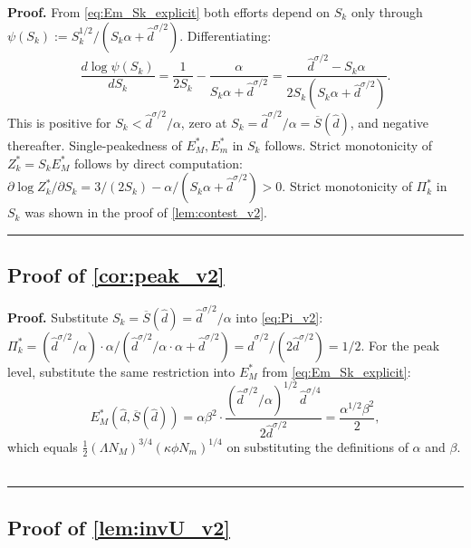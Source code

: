 \documentclass[11pt,twoside]{extarticle}
\newenvironment{proof}[1][Proof]{\noindent \textbf{#1.} }{\ \rule{0.5em}{0.5em}}
\begin{document}
\begin{proof}
From \autoref{eq:Em_Sk_explicit} both efforts depend on $S_k$ only through
$\psi(S_k) := S_k^{1/2} / (S_k\alpha + \hat d^{\sigma/2})$. Differentiating:
\[
\frac{d\log\psi(S_k)}{dS_k} = \frac{1}{2S_k} - \frac{\alpha}{S_k\alpha + \hat d^{\sigma/2}} = \frac{\hat d^{\sigma/2} - S_k\alpha}{2 S_k(S_k\alpha + \hat d^{\sigma/2})}.
\]
This is positive for $S_k < \hat d^{\sigma/2}/\alpha$, zero at
$S_k = \hat d^{\sigma/2}/\alpha = \overline S(\hat d)$, and negative thereafter.
Single-peakedness of $E_M^*, E_m^*$ in $S_k$ follows. Strict monotonicity
of $Z_k^* = S_k E_M^*$ follows by direct computation:
$\partial \log Z_k^* / \partial S_k = 3/(2S_k) - \alpha/(S_k\alpha + \hat d^{\sigma/2}) > 0$.
Strict monotonicity of $\Pi_k^*$ in $S_k$ was shown in the proof of
\autoref{lem:contest_v2}.
\end{proof}

\subsection*{Proof of \autoref{cor:peak_v2}} \label{app:proof:peak_v2}

\begin{proof}
Substitute $S_k = \overline S(\hat d) = \hat d^{\sigma/2} / \alpha$ into
\autoref{eq:Pi_v2}: $\Pi_k^* = (\hat d^{\sigma/2}/\alpha) \cdot \alpha / (\hat d^{\sigma/2}/\alpha \cdot \alpha + \hat d^{\sigma/2}) = \hat d^{\sigma/2} / (2\hat d^{\sigma/2}) = 1/2$.
For the peak level, substitute the same restriction into $E_M^*$ from
\autoref{eq:Em_Sk_explicit}:
\[
E_M^*(\hat d, \overline S(\hat d)) = \alpha\beta^2 \cdot \frac{(\hat d^{\sigma/2}/\alpha)^{1/2}\,\hat d^{\sigma/4}}{2\hat d^{\sigma/2}} = \frac{\alpha^{1/2}\beta^2}{2},
\]
which equals $\frac{1}{2}(\Lambda N_M)^{3/4}(\kappa\phi N_m)^{1/4}$ on
substituting the definitions of $\alpha$ and $\beta$.
\end{proof}

\subsection*{Proof of \autoref{lem:invU_v2}} \label{app:proof:invU_v2}
\end{document}
